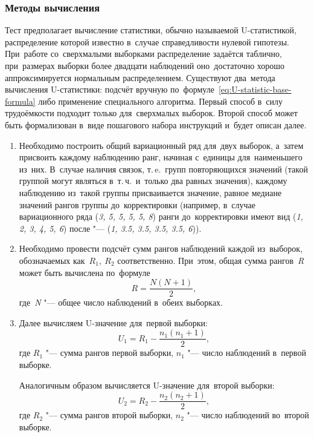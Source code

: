 \documentclass[]{scrartcl}
\begin{document}
\subsubsection{Методы вычисления}
Тест предполагает вычисление статистики, обычно называемой U-статистикой, распределение которой известно в~случае справедливости нулевой гипотезы. При~работе со~сверхмалыми выборками распределение задаётся таблично, при~размерах выборки более двадцати наблюдений оно~достаточно хорошо аппроксимируется нормальным распределением. Существуют два~метода вычисления U-статистики: подсчёт вручную по~формуле~\ref{eq:U-statistic-base-formula} либо применение специального алгоритма. Первый способ в~силу трудоёмкости подходит только для~сверхмалых выборок. Второй способ может быть формализован в~виде пошагового набора инструкций и~будет описан далее.
\begin{enumerate}
	\item Необходимо построить общий вариационный ряд для~двух выборок, а~затем присвоить каждому наблюдению ранг, начиная с~единицы для~наименьшего из~них. В~случае наличия связок, т.\,e.~групп повторяющихся значений (такой группой могут являться в~т.\,ч.~и~только два равных значения), каждому наблюдению из~такой группы присваивается значение, равное медиане значений рангов группы до~корректировки (например, в~случае вариационного ряда (\textit{3, 5, 5, 5, 5, 8}) ранги до~корректировки имеют вид (\textit{1, 2, 3, 4, 5, 6}) после "--- (\textit{1, 3.5, 3.5, 3.5, 3.5, 6})).
	\item Необходимо провести подсчёт сумм рангов наблюдений каждой из~выборок, обозначаемых как~${\textstyle R_{1},\ R_{2}}$ соответственно. При~этом, общая сумма рангов~\textit{R} может быть вычислена по~формуле
	\begin{equation}\label{eq:common-R}
	R = \frac{N(N+1)}{2},
	\end{equation}
	где~\textit{N} "--- общее число наблюдений в~обеих выборках.
	\item Далее вычисляем U-значение для~первой выборки:
	\begin{equation}\label{eq:U1}
	U_{1}=R_{1}-\frac{n_{1}(n_{1}+1)}{2},
	\end{equation}
	где ${\textstyle R_{1}}$ "--- сумма рангов первой выборки, ${\textstyle n_{1}}$ "--- число наблюдений в~первой выборке.
	
	Аналогичным образом вычисляется U-значение для~второй выборки:
	\begin{equation}\label{eq:U2}
	U_{2}=R_{2}-\frac{n_{2}(n_{2}+1)}{2},
	\end{equation}
	где ${\textstyle R_{2}}$ "--- сумма рангов второй выборки, ${\textstyle n_{2}}$ "--- число наблюдений во~второй выборке.
	

\end{enumerate}
\end{document}
